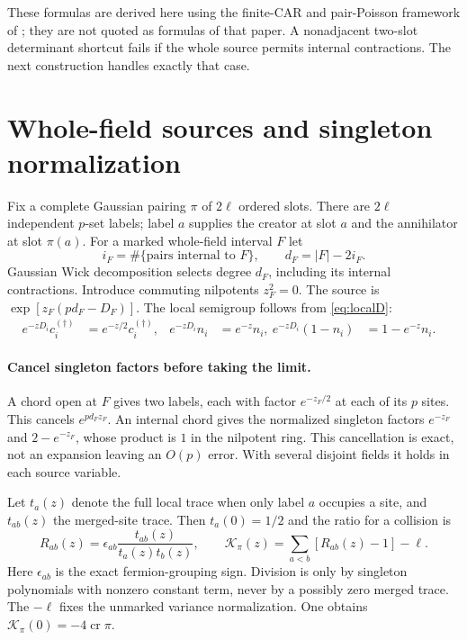 \documentclass[11pt]{article}
\newcommand{\crs}{\operatorname{cr}}
\begin{document}
These formulas are derived here using the finite-CAR and pair-Poisson
framework of \cite[Sec.~3.2--3.3]{BNR}; they are not quoted as formulas
of that paper. A nonadjacent two-slot determinant shortcut fails if
the whole source permits internal contractions. The next construction
handles exactly that case.

\newpage
\section{Whole-field sources and singleton normalization}
Fix a complete Gaussian pairing $\pi$ of $2\ell$ ordered slots.
There are $2\ell$ independent $p$-set labels; label $a$ supplies the
creator at slot $a$ and the annihilator at slot $\pi(a)$.
For a marked whole-field interval $F$ let
\begin{equation}
 i_F=\#\{\text{pairs internal to }F\},\qquad d_F=|F|-2i_F.
\end{equation}
Gaussian Wick decomposition selects degree $d_F$, including its
internal contractions. Introduce commuting nilpotents $z_F^2=0$.
The source is $\exp[z_F(pd_F-D_F)]$.
The local semigroup follows from \eqref{eq:localD}:
\begin{align}
 e^{-zD_i}c_i^{(\dagger)}&=e^{-z/2}c_i^{(\dagger)},&
 e^{-zD_i}n_i&=e^{-z}n_i,\
 e^{-zD_i}(1-n_i)&=1-e^{-z}n_i.&
\end{align}

\paragraph{Cancel singleton factors before taking the limit.}
A chord open at $F$ gives two labels, each with factor $e^{-z_F/2}$
at each of its $p$ sites. This cancels $e^{pd_Fz_F}$.
An internal chord gives the normalized singleton factors
$e^{-z_F}$ and $2-e^{-z_F}$, whose product is $1$ in the nilpotent
ring. This cancellation is exact, not an expansion leaving an $O(p)$
error. With several disjoint fields it holds in each source variable.

Let $t_a(z)$ denote the full local trace when only label $a$ occupies
a site, and $t_{ab}(z)$ the merged-site trace. Then $t_a(0)=1/2$ and
the ratio for a collision is
\begin{equation}
 R_{ab}(z)=\epsilon_{ab}\frac{t_{ab}(z)}{t_a(z)t_b(z)},\qquad
 \mathcal K_\pi(z)=\sum_{a<b}[R_{ab}(z)-1]-\ell.\label{eq:ratio}
\end{equation}
Here $\epsilon_{ab}$ is the exact fermion-grouping sign. Division is
only by singleton polynomials with nonzero constant term, never by
a possibly zero merged trace. The $-\ell$ fixes the unmarked variance
normalization. One obtains $\mathcal K_\pi(0)=-4\crs\pi$.
\end{document}
